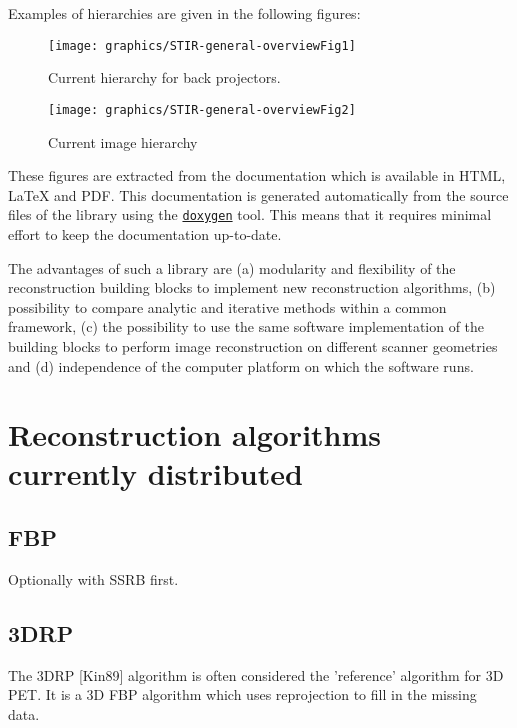 \documentclass{article}
\def\R2Lurl#1#2{\mbox{\href{#1}{\tt #2}}}
\begin{document}
Examples of hierarchies are given in the following figures:
\begin{figure}[htbp]
\begin{center}
\texttt{[image: graphics/STIR-general-overviewFig1]}
\caption{Current hierarchy for back projectors.}
\end{center}
\end{figure}


\begin{figure}[htbp]
\begin{center}
\texttt{[image: graphics/STIR-general-overviewFig2]}
\caption{Current image hierarchy}
\end{center}
\end{figure}

These figures are extracted from the documentation which is available 
in HTML, LaTeX and PDF. This documentation is generated automatically 
from the source files of the library using the \R2Lurl{http://www.doxygen.org/ }{doxygen} 
tool. This means that it requires minimal effort to keep the 
documentation up-to-date.

The advantages of such a library are (a) modularity and flexibility 
of the reconstruction building blocks to implement new reconstruction 
algorithms, (b) possibility to compare analytic and iterative 
methods within a common framework, (c) the possibility to use 
the same software implementation of the building blocks to perform 
image reconstruction on different scanner geometries and (d) 
independence of the computer platform on which the software runs.



\section{
Reconstruction algorithms currently distributed}

\subsection{FBP}
Optionally with SSRB first.

\subsection{3DRP}
The 3DRP [Kin89] algorithm is often considered the 'reference' 
algorithm for 3D PET. It is a 3D FBP algorithm which uses reprojection 
to fill in the missing data.
\end{document}
